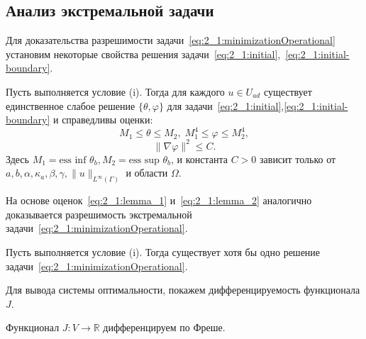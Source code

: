\subsection{Анализ экстремальной задачи}\label{subsec:ch2/sec1/subsec3}

Для доказательства разрешимости задачи~\eqref{eq:2_1:minimizationOperational}
установим некоторые свойства решения
задачи~\eqref{eq:2_1:initial},~\eqref{eq:2_1:initial-boundary}.

\begin{lemma}
    Пусть выполняется условие (i).
    Тогда для каждого $ u \in U_{ad} $ существует единственное слабое решение
    $\{\theta, \varphi \}$ для задачи~\eqref{eq:2_1:initial},\eqref{eq:2_1:initial-boundary}
    и справедливы оценки:
    \begin{equation}
        \label{eq:2_1:lemma_1}
        M_1 \le \theta \le M_2, \; M_1^4 \le \varphi \le M_2^4,
    \end{equation}
    \begin{equation}
        \label{eq:2_1:lemma_2}
        \| \nabla \varphi \|^2 \le C.
    \end{equation}
    Здесь $M_1 = \text{ess inf } \theta_b, M_2 = \text{ess sup } \theta_b$,
    и константа $C > 0$ зависит только от \\
    $a, b, \alpha, \kappa_a, \beta, \gamma,
    \|u\|_{L^\infty(\Gamma)}$ и области $\Omega$.
\end{lemma}

На основе оценок~\eqref{eq:2_1:lemma_1} и~\eqref{eq:2_1:lemma_2}
аналогично~\cite{Kovtanyuk2014TheoreticalAnalysis}
доказывается разрешимость экстремальной
задачи~\eqref{eq:2_1:minimizationOperational}.


\begin{theorem}
    \label{th:2_1:1}
    Пусть выполняется условие (i).
    Тогда существует хотя бы одно решение задачи~\eqref{eq:2_1:minimizationOperational}.
\end{theorem}

Для вывода системы оптимальности, покажем дифференцируемость функционала $J$.
\begin{lemma}
    \label{lm:2_1:freshet_diff}
    Функционал $J : V \rightarrow \mathbb{R}$ дифференцируем по Фреше.
\end{lemma}

